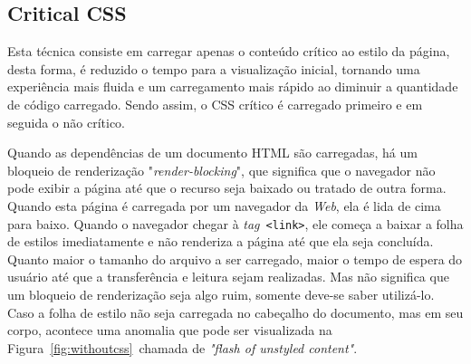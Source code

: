 \subsection{Critical CSS}
\label{SubCriticalCSS}

Esta técnica consiste em carregar apenas o conteúdo crítico ao estilo da página, desta forma, é reduzido o tempo para a visualização inicial, tornando uma experiência mais fluida e um carregamento mais rápido ao diminuir a quantidade de código carregado. Sendo assim, o CSS crítico é carregado primeiro e em seguida o não crítico.

Quando as dependências de um documento HTML são carregadas, há um bloqueio de renderização "\textit{render-blocking}", que significa que o navegador não pode exibir a página até que o recurso seja baixado ou tratado de outra forma. Quando esta página é carregada por um navegador da \textit{Web}, ela é lida de cima para baixo. Quando o navegador chegar à \textit{tag}~\texttt{<link>}, ele começa a baixar a folha de estilos imediatamente e não renderiza a página até que ela seja concluída. Quanto maior o tamanho do arquivo a ser carregado, maior o tempo de espera do usuário até que a transferência e leitura sejam realizadas. Mas não significa que um bloqueio de renderização seja algo ruim, somente deve-se saber utilizá-lo. Caso a folha de estilo não seja carregada no cabeçalho do documento, mas em seu corpo, acontece uma anomalia que pode ser visualizada na Figura~\ref{fig:withoutcss}~chamada de \textit{"flash of unstyled content"}.

\begin{figure}[th]
\end{figure}

